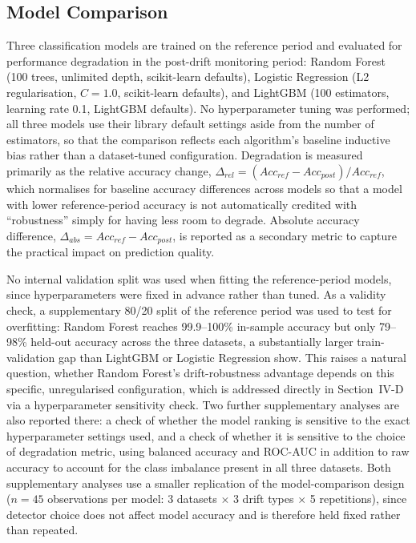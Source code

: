 \documentclass[conference]{IEEEtran}
\begin{document}
\subsection{Model Comparison}

Three classification models are trained on the reference period and evaluated for performance degradation in the post-drift monitoring period: Random Forest (100 trees, unlimited depth, scikit-learn defaults), Logistic Regression (L2 regularisation, $C=1.0$, scikit-learn defaults), and LightGBM (100 estimators, learning rate 0.1, LightGBM defaults). No hyperparameter tuning was performed; all three models use their library default settings aside from the number of estimators, so that the comparison reflects each algorithm's baseline inductive bias rather than a dataset-tuned configuration. Degradation is measured primarily as the relative accuracy change, $\Delta_{rel} = (Acc_{ref} - Acc_{post}) / Acc_{ref}$, which normalises for baseline accuracy differences across models so that a model with lower reference-period accuracy is not automatically credited with ``robustness'' simply for having less room to degrade. Absolute accuracy difference, $\Delta_{abs} = Acc_{ref} - Acc_{post}$, is reported as a secondary metric to capture the practical impact on prediction quality.

No internal validation split was used when fitting the reference-period models, since hyperparameters were fixed in advance rather than tuned. As a validity check, a supplementary 80/20 split of the reference period was used to test for overfitting: Random Forest reaches 99.9--100\% in-sample accuracy but only 79--98\% held-out accuracy across the three datasets, a substantially larger train-validation gap than LightGBM or Logistic Regression show. This raises a natural question, whether Random Forest's drift-robustness advantage depends on this specific, unregularised configuration, which is addressed directly in Section~IV-D via a hyperparameter sensitivity check. Two further supplementary analyses are also reported there: a check of whether the model ranking is sensitive to the exact hyperparameter settings used, and a check of whether it is sensitive to the choice of degradation metric, using balanced accuracy and ROC-AUC in addition to raw accuracy to account for the class imbalance present in all three datasets. Both supplementary analyses use a smaller replication of the model-comparison design ($n=45$ observations per model: 3 datasets $\times$ 3 drift types $\times$ 5 repetitions), since detector choice does not affect model accuracy and is therefore held fixed rather than repeated.
\end{document}
